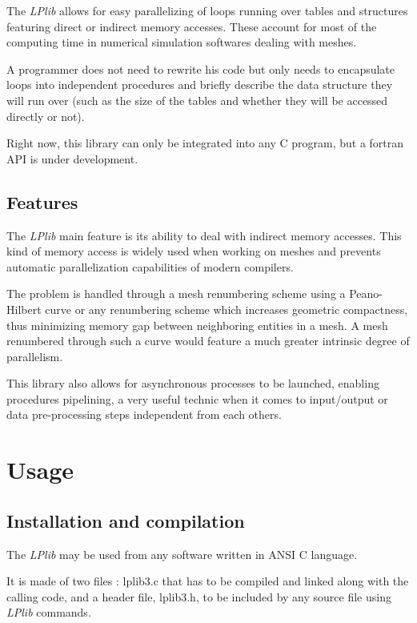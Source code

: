 \documentclass[a4paper,12pt]{article}
\begin{document}
The \emph{LPlib} allows for easy parallelizing of loops running over tables and structures featuring direct or indirect memory accesses. These account for most of the computing time in numerical simulation softwares dealing with meshes.

A programmer does not need to rewrite his code but only needs to encapsulate loops into independent procedures and briefly describe the data structure they will run over (such as the size of the tables and whether they will be accessed directly or not).

Right now, this library can only be integrated into any C program, but a fortran API is under development.

\subsection{Features}

The \emph{LPlib} main feature is its ability to deal with indirect memory accesses. This kind of memory access is widely used when working on meshes and prevents automatic parallelization capabilities of modern compilers.

The problem is handled through a mesh renumbering scheme using a Peano-Hilbert curve \cite{peano_hilbert} or any renumbering scheme which increases geometric compactness, thus minimizing memory gap between neighboring entities in a mesh. A mesh renumbered through such a curve would feature a much greater intrinsic degree of parallelism.

This library also allows for asynchronous processes to be launched, enabling procedures pipelining, a very useful technic when it comes to input/output or data pre-processing steps independent from each others.


%
%

\section{Usage}

\subsection{Installation and compilation}

The \emph{LPlib} may be used from any software written in ANSI C language.

It is made of two files : lplib3.c that has to be compiled and linked along with the calling code, and a header file, lplib3.h, to be included by any source file using \emph{LPlib} commands.
\end{document}
